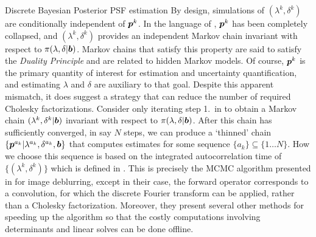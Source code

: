\begin{chapter}{Discrete Bayesian Posterior PSF estimation}
By design, simulations of $(\lambda^k,\delta^k)$ are conditionally independent of $\mbox{\boldmath$p$}^k$.
In the language of \citep{van2008partially}, $\mbox{\boldmath$p$}^k$ has been completely collapsed, and $(\lambda^k,\delta^k)$ provides an independent Markov chain invariant with respect to $\pi(\lambda,\delta|\mbox{\boldmath$b$})$.
Markov chains that satisfy this property are said to satisfy the \emph{Duality Principle} \citep[Section 9.2.3]{robert2013monte} and are related to hidden Markov models. %
Of course, $\mbox{\boldmath$p$}^k$ is the primary quantity of interest for estimation and uncertainty quantification, and estimating $\lambda$ and $\delta$ are auxiliary to that goal.
Despite this apparent mismatch, it does suggest a strategy that can reduce the number of required Cholesky factorizations.
Consider only iterating step 1.~in  to obtain a Markov chain $(\lambda^k,\delta^k|\mbox{\boldmath$b$})$ invariant with respect to $\pi(\lambda,\delta|\mbox{\boldmath$b$})$. 
After this chain has sufficiently converged, in say $N$ steps, we can produce a `thinned' chain $\{\mbox{\boldmath$p$}^{a_k}|\lambda^{a_k},\delta^{a_k},\mbox{\boldmath$b$}\}$ that computes estimates for some sequence $\{a_k\} \subseteq \{1\dots N\}$.
How we choose this sequence is based on the integrated autocorrelation time of $\{(\lambda^k,\delta^k)\}$ which is defined in .
This is precisely the MCMC algorithm presented in \citep{fox2015fast} for image deblurring, except in their case, the forward operator corresponds to a convolution, for which the discrete Fourier transform can be applied, rather than a Cholesky factorization.
Moreover, they present several other methods for speeding up the algorithm so that the costly computations involving determinants and linear solves can be done offline.


\end{chapter}
